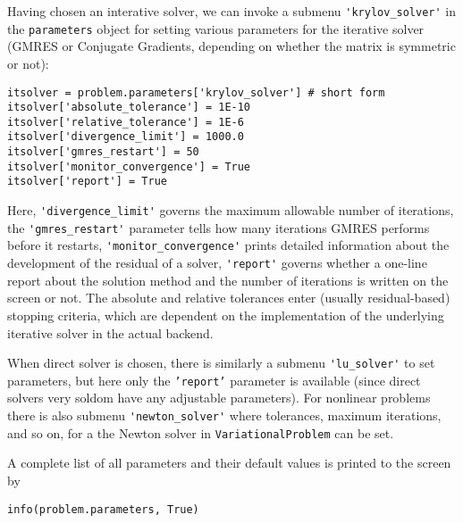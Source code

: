 Having chosen an interative solver, we can invoke 
a submenu {\fontsize{12pt}{12pt}\verb!'krylov_solver'!}
in the
{\fontsize{12pt}{12pt}\texttt{parameters}} object for setting various parameters for 
the iterative solver (GMRES or Conjugate Gradients, depending on
whether the matrix is symmetric or not):
\begin{Verbatim}[fontsize=\fontsize{10pt}{10pt},tabsize=8,baselinestretch=1.05,
fontfamily=tt,xleftmargin=7mm]
itsolver = problem.parameters['krylov_solver'] # short form
itsolver['absolute_tolerance'] = 1E-10
itsolver['relative_tolerance'] = 1E-6
itsolver['divergence_limit'] = 1000.0
itsolver['gmres_restart'] = 50
itsolver['monitor_convergence'] = True
itsolver['report'] = True
\end{Verbatim}
\noindent
Here, {\fontsize{12pt}{12pt}\verb!'divergence_limit'!} 
governs the maximum allowable number of iterations,
the {\fontsize{12pt}{12pt}\verb!'gmres_restart'!} parameter tells how many iterations GMRES performs before
it restarts,
{\fontsize{12pt}{12pt}\verb!'monitor_convergence'!} prints detailed information about the
development of the residual of a solver,
{\fontsize{12pt}{12pt}\verb!'report'!} governs whether a one-line report about the solution
method and the number of iterations
is written on the screen or not. The absolute and relative tolerances
enter (usually residual-based) stopping criteria, which are dependent on
the implementation of the underlying iterative solver in the actual backend.


When direct solver is chosen, there is similarly a submenu
{\fontsize{12pt}{12pt}\verb!'lu_solver'!} to set parameters, but here only the {\fontsize{12pt}{12pt}\texttt{'report'}}
parameter is available (since direct solvers very soldom have any
adjustable parameters). For nonlinear problems there is also 
submenu {\fontsize{12pt}{12pt}\verb!'newton_solver'!} where tolerances, maximum iterations, and
so on, for a the Newton solver in {\fontsize{12pt}{12pt}\texttt{VariationalProblem}} can be set.

A complete list of all parameters and their default values
is printed to the screen by
\begin{Verbatim}[fontsize=\fontsize{10pt}{10pt},tabsize=8,baselinestretch=1.05,
fontfamily=tt,xleftmargin=7mm]
info(problem.parameters, True)
\end{Verbatim}
\noindent

